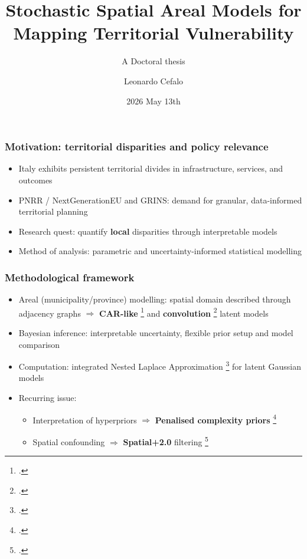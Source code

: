 \documentclass[13pt ]{beamer}
\title[PhD Thesis] %
{Stochastic Spatial Areal Models for Mapping Territorial Vulnerability}
\subtitle{A Doctoral thesis}
\author[Cefalo, Leonardo] %
{Leonardo Cefalo\inst{1} }
\institute[UniBa] %
{
  \inst{1}%
  Department of Economics and Finance\\
  University of Bari Aldo Moro
}
\date[2026 May 13th] %
{2026 May 13th}
\begin{document}
\frame{\titlepage}





\begin{frame}
\frametitle{Motivation: territorial disparities and policy relevance}
\begin{itemize}
  \item Italy exhibits persistent territorial divides in infrastructure, services, and outcomes
  \item PNRR / NextGenerationEU and GRINS: demand for granular, data-informed territorial planning
  \item Research quest: quantify \textbf{local} disparities through interpretable models
  \item[$\Rightarrow$] Method of analysis: parametric and uncertainty-informed statistical modelling
\end{itemize}
\end{frame}

\begin{frame}
\frametitle{Methodological framework}
\begin{itemize}
  \item Areal (municipality/province) modelling: spatial domain described through adjacency graphs $\Rightarrow$ \textbf{CAR-like} \footcite{CAR, MacNab} and \textbf{convolution} \footcite{BYM, BYM2} latent models
  \item Bayesian inference: interpretable uncertainty, flexible prior setup and model comparison
  \item Computation: integrated Nested Laplace Approximation \footcite{INLA, VBINLA2024} for latent Gaussian models
  \item Recurring issue: 
  \begin{itemize}
  \item Interpretation of hyperpriors $\Rightarrow$ \textbf{Penalised complexity priors} \footcite{PC}
  \item Spatial confounding $\Rightarrow$ \textbf{Spatial+2.0} filtering \footcite{Urdangarin24}
  \end{itemize}
\end{itemize}
\end{frame}
\end{document}

